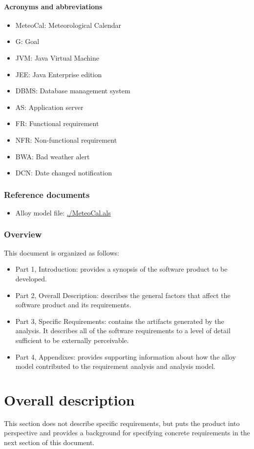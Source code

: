 \documentclass[10pt,a4paper,titlepage]{article}
\begin{document}
\subsection{Acronyms and abbreviations}
\begin{itemize}
\item MeteoCal: Meteorological Calendar
\item G: Goal
\item JVM: Java Virtual Machine
\item JEE: Java Enterprise edition
\item DBMS: Database management system
\item AS: Application server
\item FR: Functional requirement
\item NFR: Non-functional requirement
\item BWA: Bad weather alert
\item DCN: Date changed notification
\end{itemize}

\section{Reference documents}
\begin{itemize}
\item Alloy model file: \url{./MeteoCal.als}
\end{itemize}

\section{Overview}
This document is organized as follows:
\begin{itemize}
\item Part 1, Introduction: provides a synopsis of the software product to be developed.
\item Part 2, Overall Description: describes the general factors that affect the software product and its requirements.
\item Part 3, Specific Requirements: contains the artifacts generated by the analysis. It describes all of the software requirements to a level of detail sufficient to be externally perceivable.
\item Part 4, Appendixes: provides supporting information about how the alloy model contributed to the requirement analysis and analysis model.
\end{itemize}

\clearpage
\part{Overall description}
This section does not describe specific requirements, but puts the product into perspective and provides a background for specifying concrete requirements in the next section of this document.
\end{document}
